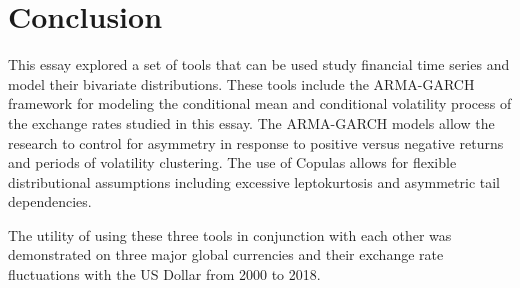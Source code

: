 \documentclass[12pt]{article}
\begin{document}
\section{Conclusion} \label{sec:Conclusion}

This essay explored a set of tools that can be used study financial time series and model their bivariate distributions. These tools include the ARMA-GARCH framework for modeling the conditional mean and conditional volatility process of the exchange rates studied in this essay. The ARMA-GARCH models allow the research to control for asymmetry in response to positive versus negative returns and periods of volatility clustering. The use of Copulas allows for flexible distributional assumptions including excessive leptokurtosis and asymmetric tail dependencies.

The utility of using these three tools in conjunction with each other was demonstrated on three major global currencies and their exchange rate fluctuations with the US Dollar from 2000 to 2018.
\end{document}
